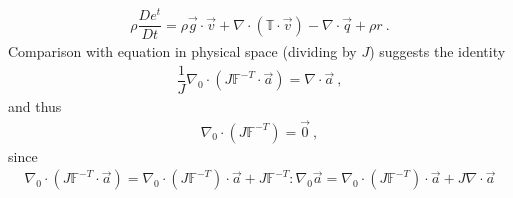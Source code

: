 \documentclass[letterpaper,10pt,english]{jupyterBook}
\begin{document}
\begin{equation*}
\begin{split}\rho \dfrac{D e^t}{D t} = \rho \vec{g} \cdot \vec{v} + \nabla \cdot \left( \mathbb{T} \cdot \vec{v} \right) - \nabla \cdot \vec{q} + \rho r \ .\end{split}
\end{equation*}
\sphinxAtStartPar
Comparison with equation in physical space (dividing by \(J\)) suggests the identity
\begin{equation*}
\begin{split}\dfrac{1}{J} \nabla_0 \cdot \left( J \mathbb{F}^{-T} \cdot \vec{a} \right) = \nabla \cdot \vec{a} \ ,\end{split}
\end{equation*}
\sphinxAtStartPar
and thus
\begin{equation*}
\begin{split}\nabla_0 \cdot ( J \mathbb{F}^{-T} ) = \vec{0} \ ,\end{split}
\end{equation*}
\sphinxAtStartPar
since
\begin{equation*}
\begin{split}
\nabla_0 \cdot \left( J \mathbb{F}^{-T} \cdot \vec{a} \right) 
= \nabla_0 \cdot \left( J \mathbb{F}^{-T} \right) \cdot \vec{a}
+ J \mathbb{F}^{-T} : \nabla_0 \vec{a} = 
 \nabla_0 \cdot \left( J \mathbb{F}^{-T} \right) \cdot \vec{a} + J \nabla \cdot \vec{a}
\end{split}
\end{equation*}
\sphinxAtStartPar
{}
\end{document}
